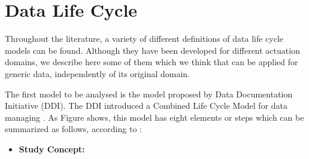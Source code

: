 \section{Data Life Cycle}

Throughout the literature, a variety of different definitions of data life cycle models can be found. Although they have been developed for different actuation domains, we describe here some of them which we think that can be applied for generic data, independently of its original domain.

The first model to be analysed is the model proposed by Data Documentation Initiative (DDI). The DDI introduced a Combined Life Cycle Model for data managing \cite{data_documentation_initiative_overview_2008}. As Figure shows, this model has eight elements or steps which can be summarized as follows, according to \cite{ball_review_2012}:

\begin{itemize}
    \item \textbf{Study Concept:} 
\end{itemize}
